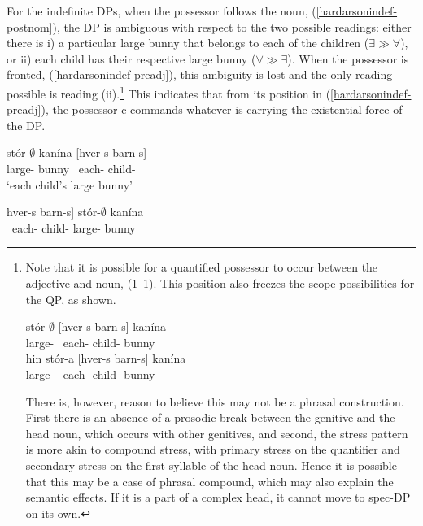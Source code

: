 \documentclass[output=paper,colorlinks,citecolor=brown,
]{langscibook}
\begin{document}
For the indefinite DPs, when the possessor follows the noun, (\ref{hardarsonindef-postnom}), the DP is ambiguous with respect to the two possible readings: either there is i) a particular large bunny that belongs to each of the children ($\exists \gg \forall$), or ii) each child has their respective large bunny ($\forall \gg \exists$). When the possessor is fronted, (\ref{hardarsonindef-preadj}), this ambiguity is lost and the only reading possible is reading (ii).\footnote{
Note that it is possible for a quantified possessor to occur between the adjective and noun, (\ref{hardarsonindef-postadj}--\ref{hardarsondef-postadj}). This position also freezes the scope possibilities for the QP, as shown.

\begin{exe}
\settowidth{}
	\ex	\gll	stór-$\emptyset$ [hver-s barn-s] kanína \label{hardarsonindef-postadj}\\
					large-{\hardStr} ~each-{\hardGen} child-{\hardGen} bunny\\ \jambox{$\exists \gg \forall$; *$\forall \gg \exists$}
			\glt
		\ex	\gll	hin stór-a [hver-s barn-s] kanína \label{hardarsondef-postadj}\\
						{\hardArt} large-{\hardWk} ~each-{\hardGen} child-{\hardGen} bunny\\ 
				\glt
\end{exe}

There is, however, reason to believe this may not be a phrasal construction. First there is an absence of a prosodic break between the genitive and the head noun, which occurs with other genitives, and second, the stress pattern is more akin to compound stress, with primary stress on the quantifier and secondary stress on the first syllable of the head noun. Hence it is possible that this may be a case of phrasal compound, which may also explain the semantic effects. If it is a part of a complex head, it cannot move to spec-DP on its own.}
This indicates that from its position in (\ref{hardarsonindef-preadj}), the possessor c-commands whatever is carrying the existential force of the DP.

\begin{exe}
\settowidth\jamwidth {*$\exists \gg \forall$; $\forall \gg \exists$}
\ex	\label{hardarsoninnie-QR}
	\begin{xlist}
		\ex	\gll	stór-$\emptyset$ kanína [hver-s barn-s] \label{hardarsonindef-postnom}\\
					large-{\hardStr} bunny	~each-{\hardGen} child-{\hardGen}\\ \jambox{$\exists \gg \forall$; $\forall \gg \exists$}
			\glt	`each child's large bunny'  
	
		\ex	\gll	{[}hver-s barn-s] stór-$\emptyset$ kanína \label{hardarsonindef-preadj}\\
					~each-{\hardGen} child-{\hardGen} large-{\hardStr} bunny\\ \jambox{*$\exists \gg \forall$; $\forall \gg \exists$}
			\glt 	
	\end{xlist}
\end{exe}
\end{document}
